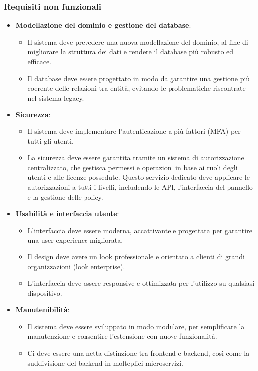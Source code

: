 \subsubsection{Requisiti non funzionali}
\begin{itemize}
  \item \textbf{Modellazione del dominio e gestione del database}:
    \begin{itemize}
      \item Il sistema deve prevedere una nuova modellazione del dominio, al fine di migliorare la struttura dei dati e rendere il database più robusto ed efficace.
      \item Il database deve essere progettato in modo da garantire una gestione più coerente delle relazioni tra entità, evitando le problematiche riscontrate nel sistema legacy.
    \end{itemize}

  \item \textbf{Sicurezza}:
    \begin{itemize}
      \item Il sistema deve implementare l’autenticazione a più fattori (MFA) per tutti gli utenti.
      \item La sicurezza deve essere garantita tramite un sistema di autorizzazione centralizzato, che gestisca permessi e operazioni in base ai ruoli degli utenti e alle licenze possedute. Questo servizio dedicato deve applicare le autorizzazioni a tutti i livelli, includendo le API, l’interfaccia del pannello e la gestione delle policy.
    \end{itemize}

  \item \textbf{Usabilità e interfaccia utente}:
    \begin{itemize}
      \item L’interfaccia deve essere moderna, accattivante e progettata per garantire una user experience migliorata.
      \item Il design deve avere un look professionale e orientato a clienti di grandi organizzazioni (look enterprise).
      \item L’interfaccia deve essere responsive e ottimizzata per l’utilizzo su qualsiasi dispositivo.
    \end{itemize}

  \item \textbf{Manutenibilità}:
    \begin{itemize}
      \item Il sistema deve essere sviluppato in modo modulare, per semplificare la manutenzione e consentire l’estensione con nuove funzionalità.
      \item Ci deve essere una netta distinzione tra frontend e backend, così come la suddivisione del backend in molteplici microservizi.
    \end{itemize}
\end{itemize}

